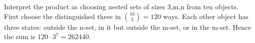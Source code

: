 Interpret the product as choosing nested sets of sizes 3,m,n from ten objects. First choose the distinguished three in $\binom{10}3=120$ ways. Each other object has three states: outside the n-set, in it but outside the m-set, or in the m-set. Hence the sum is $120\cdot3^7=\boxed{262440}$.
